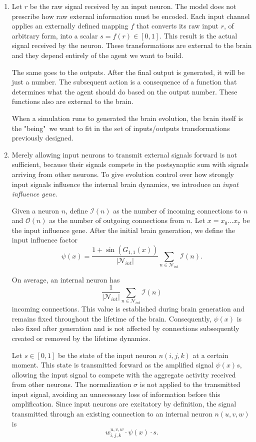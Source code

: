 \documentclass[12pt,a4paper]{article}
\begin{document}
\begin{enumerate}
	\item Let $r$ be the raw signal received by an input neuron. 	The model does not prescribe how raw external information must be encoded. Each input channel applies an externally defined mapping $f$ that converts its raw input $r$, of arbitrary form, into a scalar $s = f(r) \in [0,1]$. This result is the actual signal received by the neuron. These transformations are external to the brain and they depend entirely of the agent we want to build. 
	
	The same goes to the outputs. After the final output is generated, it will be just a number. The subsequent action is a consequence of a function that determines what the agent should do based on the output number. These functions also are external to the brain. 
	
	When a simulation runs to generated the brain evolution, the brain itself is the "being"\ we want to fit in the set of inputs/outputs transformations previously designed. 
	
	\item Merely allowing input neurons to transmit external signals forward is not sufficient, because their signals compete in the postsynaptic sum with signals arriving from other neurons. To give evolution control over how strongly input signals influence the internal brain dynamics, we introduce an \emph{input influence gene}.

	Given a neuron $n$, define $\mathcal{I}(n)$ as the number of incoming connections to $n$ and $\mathcal{O}(n)$ as the number of outgoing connections from $n$. Let $x=x_0\ldots x_7$ be the input influence gene. After the initial brain generation, we define the input influence factor
	$$\psi(x) = \frac{1 + \sin\left(G_{1,1}(x)\right)}{|\mathcal{N}_{int}|} \sum_{n \in \mathcal{N}_{int}}\mathcal{I}(n).$$

	On average, an internal neuron has
	$$\frac{1}{|\mathcal{N}_{int}|} \sum_{n \in \mathcal{N}_{int}}\mathcal{I}(n)$$
incoming connections. This value is established during brain generation and remains fixed throughout the lifetime of the brain. Consequently, $\psi(x)$ is also fixed after generation and is not affected by connections subsequently created or removed by the lifetime dynamics.

	Let $s\in[0,1]$ be the state of the input neuron $n(i,j,k)$ at a certain moment. This state is transmitted forward as the amplified signal $\psi(x)s$, allowing the input signal to compete with the aggregate activity received from other neurons. The normalization $\sigma$ is not applied to the transmitted input signal, avoiding an unnecessary loss of information before this amplification. Since input neurons are excitatory by definition, the signal transmitted through an existing connection to an internal neuron $n(u,v,w)$ is
	$$w_{i,j,k}^{u,v,w} \cdot \psi(x) \cdot s.$$


\end{enumerate}
\end{document}
